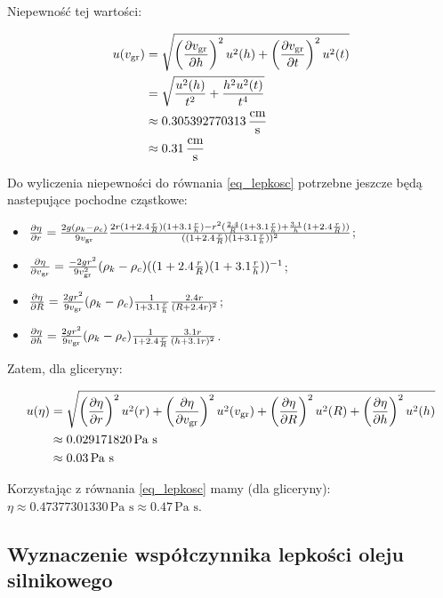 \documentclass[a4paper]{article}
\begin{document}
Niepewność tej wartości:

\begin{align*}
	u(v_{\text{gr}}) &= \sqrt{\left(\frac{\partial v_{\text{gr}}}{\partial h}\right)^2 u^2(h) + \left(\frac{\partial v_{\text{gr}}}{\partial t}\right)^2 u^2(t)} \\
	&= \sqrt{\frac{u^2(h)}{t^2} + \frac{h^2 u^2(t)}{t^4}} \\
	&\approx 0.305392770313 \, \frac{\text{cm}}{\text{s}} \\
	&\approx 0.31 \, \frac{\text{cm}}{\text{s}}
\end{align*}

Do wyliczenia niepewności do równania \ref{eq_lepkosc} potrzebne jeszcze będą nastepujące pochodne cząstkowe:

\begin{itemize}
	\item $\frac{\partial \eta}{\partial r} =
		\frac{2 g (\rho_k - \rho_c)}{9 v_{\text{gr}}}
		\frac{2 r (1 + 2.4 \frac rR) (1 + 3.1 \frac rh) - r^2 (\frac{2.4}{R}(1 + 3.1 \frac rh) + \frac{3.1}{h}(1 + 2.4 \frac rR))}{((1 + 2.4 \frac rR)(1 + 3.1 \frac rh))^2}$;
	\item $\frac{\partial \eta}{\partial v_{\text{gr}}} = \frac{-2 g r^2}{9 v_{\text{gr}}^2} (\rho_k - \rho_c) ((1 + 2.4 \frac rR) (1 + 3.1 \frac rh))^{-1}$;
	\item $\frac{\partial \eta}{\partial R} = \frac{2 g r^2}{9 v_{\text{gr}}} (\rho_k - \rho_c) \frac{1}{1 + 3.1 \frac rh} \frac{2.4r}{(R + 2.4 r)^2}$;
	\item $\frac{\partial \eta}{\partial h} = \frac{2 g r^2}{9 v_{\text{gr}}} (\rho_k - \rho_c) \frac{1}{1 + 2.4 \frac rR} \frac{3.1 r}{(h + 3.1 r)^2}$.
\end{itemize}

Zatem, dla gliceryny:

\begin{align*}
	u(\eta) &= \sqrt{
	  \left(\frac{\partial \eta}{\partial r}\right)^2 u^2(r)
	+ \left(\frac{\partial \eta}{\partial v_{\text{gr}}}\right)^2 u^2(v_{\text{gr}})
	+ \left(\frac{\partial \eta}{\partial R}\right)^2 u^2(R)
	+ \left(\frac{\partial \eta}{\partial h}\right)^2 u^2(h)
	} \\
	&\approx 0.029171820 \, \text{Pa s}\\
	&\approx 0.03 \, \text{Pa s}
\end{align*}

Korzystając z równania \ref{eq_lepkosc} mamy (dla gliceryny): $\eta \approx 0.47377301330 \, \text{Pa s} \approx 0.47 \, \text {Pa s}$.

\subsection{Wyznaczenie współczynnika lepkości oleju silnikowego}
\end{document}
